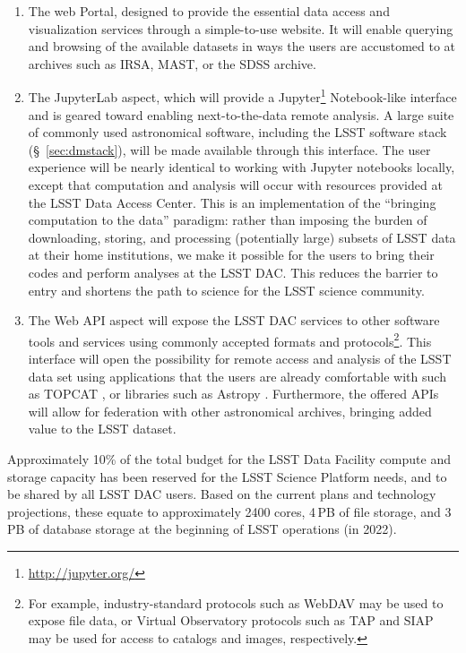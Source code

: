 \begin{enumerate}

\item The web Portal, designed to provide the essential data access and
visualization services through a simple-to-use website.  It will enable
querying and browsing of the available datasets in ways the users are
accustomed to at archives such as IRSA, MAST, or the SDSS archive.

\item The JupyterLab aspect, which will provide a
Jupyter\footnote{\url{http://jupyter.org/}} Notebook-like
interface and is geared toward enabling next-to-the-data remote analysis.
A large suite of commonly used astronomical software, including the LSST
software stack (\S~\ref{sec:dmstack}), will be made available through this
interface.  The user experience will be nearly identical to working with
Jupyter notebooks locally, except that computation and analysis will occur
with resources provided at the LSST Data Access Center.  This is an
implementation of the ``bringing computation to the data'' paradigm: rather
than imposing the burden of downloading, storing, and processing
(potentially large) subsets of LSST data at their home institutions, we make
it possible for the users to bring their codes and perform analyses at the
LSST DAC.  This reduces the barrier to entry and shortens the path to
science for the LSST science community.

\item The Web API aspect will expose the LSST DAC services to other
software tools and services using commonly accepted formats and protocols\footnote{For
example, industry-standard protocols such as WebDAV may be used to expose
file data, or Virtual Observatory protocols such as TAP and SIAP may
be used for access to catalogs and images, respectively.}.  This interface will open the
possibility for remote access and analysis of the LSST data set using
applications that the users are already comfortable with such as
TOPCAT \citep{2005ASPC..347...29T}, or libraries such as Astropy \citep{2013A&A...558A..33A,2016SPIE.9913E..0GJ}.  Furthermore, the offered APIs will allow
for federation with other astronomical archives, bringing added value to the
LSST dataset.
\end{enumerate}

Approximately 10\% of the total budget for the LSST Data Facility
compute and storage capacity has been reserved for the LSST Science Platform
needs, and to be shared by all LSST DAC users.  Based on the current plans and
technology projections, these equate to approximately 2400 cores, 4\,PB of
file storage, and 3\,PB of database storage at the beginning of LSST
operations (in 2022).

